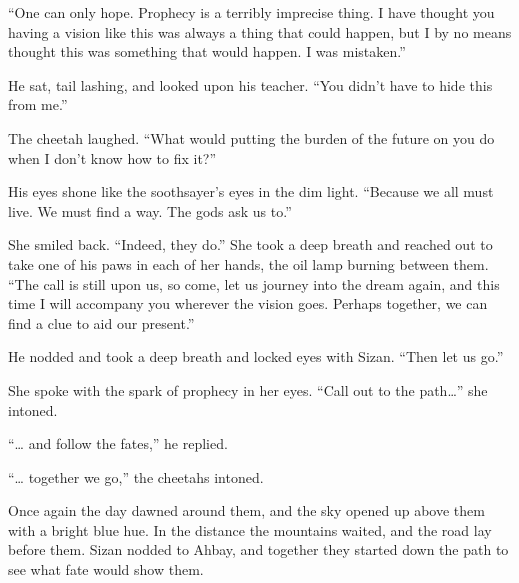 ``One can only hope. Prophecy is a terribly imprecise thing. I have thought you having a vision like this was always a thing that could happen, but I by no means thought this was something that would happen. I was mistaken.''

He sat, tail lashing, and looked upon his teacher. ``You didn't have to hide this from me.''

The cheetah laughed. ``What would putting the burden of the future on you do when I don't know how to fix it?''

His eyes shone like the soothsayer's eyes in the dim light. ``Because we all must live. We must find a way. The gods ask us to.''

She smiled back. ``Indeed, they do.'' She took a deep breath and reached out to take one of his paws in each of her hands, the oil lamp burning between them. ``The call is still upon us, so come, let us journey into the dream again, and this time I will accompany you wherever the vision goes. Perhaps together, we can find a clue to aid our present.''

He nodded and took a deep breath and locked eyes with Sizan. ``Then let us go.''

She spoke with the spark of prophecy in her eyes. ``Call out to the path\ldots'' she intoned.

``\ldots{} and follow the fates,'' he replied.

``\ldots{} together we go,'' the cheetahs intoned.

Once again the day dawned around them, and the sky opened up above them with a bright blue hue. In the distance the mountains waited, and the road lay before them. Sizan nodded to Ahbay, and together they started down the path to see what fate would show them.
